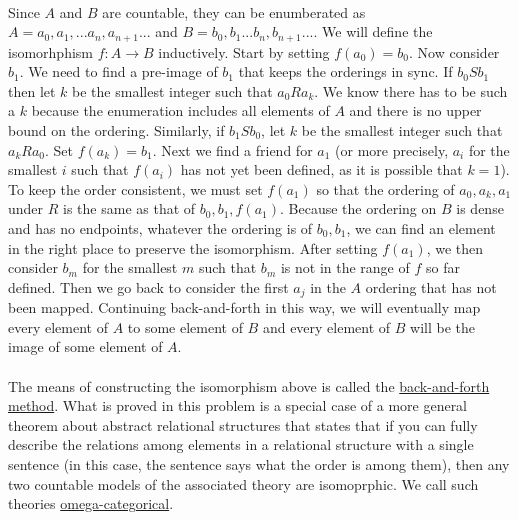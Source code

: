 \documentclass[11pt,a4paper]{report}
\theoremstyle{plain}
\theoremstyle{definition}
\theoremstyle{remark}
\begin{document}
  \\
  Since $A$ and $B$ are countable, they can be enumberated as $A = a_0, a_1, ...a_n, a_{n+1}...$ and $B = b_0, b_1...b_n, b_{n+1}...$.  We will define the isomorhphism $f:A\rightarrow B$ inductively.  Start by setting $f(a_0)  = b_0$.  Now consider $b_1$.   We need to find a pre-image of $b_1$ that keeps the orderings in sync.  If  $b_0Sb_1$ then let $k$ be the smallest integer such that $a_0Ra_k$.  We know there has to be such a $k$ because the enumeration includes all elements of $A$ and there is no upper bound on the ordering.  Similarly, if   $b_1Sb_0$, let $k$ be the smallest integer such that $a_kRa_0$. Set $f(a_k) = b_1$.  Next we find a friend for $a_1$  (or more precisely, $a_i$ for the smallest $i$ such that $f(a_i)$ has not yet been defined, as it is possible that $k = 1$).  To keep the order consistent, we must set $f(a_1)$ so that the ordering of $a_0, a_k, a_1$ under $R$ is the same as that of  $b_0,b_1, f(a_1)$.  Because the ordering on $B$ is dense and has no endpoints, whatever the ordering is of $b_0, b_1$, we can find an element in the right place to preserve the isomorphism.  After setting $f(a_1)$, we then consider $b_m$ for the smallest $m$ such that $b_m$ is not in the range of $f$ so far defined.  Then we go back to consider the first $a_j$ in the $A$ ordering that has not been mapped.  Continuing back-and-forth in this way, we will eventually map every element of $A$ to some element of $B$ and every element of $B$ will be the image of some element of $A$.
  \\\\
  The means of constructing the isomorphism above is called the  \href{https://en.wikipedia.org/wiki/Back-and-forth_method}{back-and-forth method}.  What is proved in this problem is a special case of a more general theorem about abstract relational structures that  states that if you can fully describe the relations among elements  in a relational structure with a single sentence (in this case, the sentence says what the order is among them), then any two countable models of the associated theory are isomoprphic.  We call such theories  \href{https://en.wikipedia.org/wiki/Omega-categorical_theory}{omega-categorical}.
\end{document}
